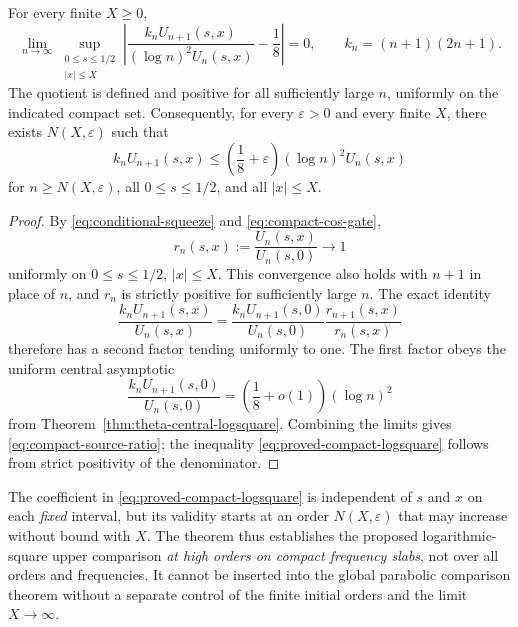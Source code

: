 \begin{theorem}
\label{thm:compact-source-logsquare}
For every finite $X\ge0$,
\begin{equation}
\boxed{
\lim_{n\to\infty}
\sup_{\substack{0\le s\le1/2\\ |x|\le X}}
\left|
\frac{k_nU_{n+1}(s,x)}
{(\log n)^2U_n(s,x)}-\frac18
\right|=0,
\qquad k_n=(n+1)(2n+1).}
\label{eq:compact-source-ratio}
\end{equation}
The quotient is defined and positive for
all sufficiently large $n$, uniformly on
the indicated compact set. Consequently,
for every $\varepsilon>0$ and every finite $X$,
there exists $N(X,\varepsilon)$ such that
\begin{equation}
k_nU_{n+1}(s,x)
\le\left(\frac18+\varepsilon\right)
(\log n)^2 U_n(s,x)
\label{eq:proved-compact-logsquare}
\end{equation}
for $n\ge N(X,\varepsilon)$, all
$0\le s\le1/2$, and all $|x|\le X$.
\end{theorem}
\begin{proof}
By \eqref{eq:conditional-squeeze} and
\eqref{eq:compact-cos-gate},
\[
r_n(s,x):=\frac{U_n(s,x)}{U_n(s,0)}
\longrightarrow1
\]
uniformly on $0\le s\le1/2$, $|x|\le X$.
This convergence also holds with $n+1$
in place of $n$, and $r_n$ is strictly
positive for sufficiently large $n$.
The exact identity
\begin{equation}
\frac{k_nU_{n+1}(s,x)}{U_n(s,x)}
=
\frac{k_nU_{n+1}(s,0)}{U_n(s,0)}
\frac{r_{n+1}(s,x)}{r_n(s,x)}
\label{eq:source-ratio-factor}
\end{equation}
therefore has a second factor tending
uniformly to one. The first factor obeys
the uniform central asymptotic
\[
\frac{k_nU_{n+1}(s,0)}{U_n(s,0)}
=\left(\frac18+o(1)\right)(\log n)^2
\]
from Theorem~\ref{thm:theta-central-logsquare}.
Combining the limits gives
\eqref{eq:compact-source-ratio}; the
inequality \eqref{eq:proved-compact-logsquare}
follows from strict positivity of
the denominator.
\end{proof}

The coefficient in \eqref{eq:proved-compact-logsquare}
is independent of $s$ and $x$ on each
\emph{fixed} interval, but its validity
starts at an order $N(X,\varepsilon)$
that may increase without bound with $X$.
The theorem thus establishes the proposed
logarithmic-square upper comparison
\emph{at high orders on compact frequency slabs},
not over all orders and frequencies.
It cannot be inserted into the global
parabolic comparison theorem without
a separate control of the finite initial
orders and the limit $X\to\infty$.

